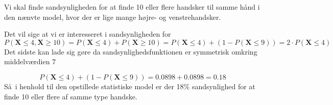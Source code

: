 {
Vi skal finde sandsynligheden for at finde 10 eller flere handsker til samme h\aa nd i den n\ae nvte model, hvor der er lige mange h\o jre- og venstrehandsker.

Det vil sige at vi er interesseret i sandsynligheden for
\[
P(\mathbf{X} \leq 4,\mathbf{X}\geq 10) = P(\mathbf{X} \leq 4) + P(\mathbf{X}\geq 10) = P(\mathbf{X} \leq 4) + (1 - P(\mathbf{X} \leq 9)) = 2 \cdot P(\mathbf{X} \leq 4)
\]
Det sidste kan lade sig g\o re da sandsynlighedsfunktionen er symmetrisk omkring middelv\ae rdien $7$

\[
P(\mathbf{X} \leq 4) + (1 - P(\mathbf{X} \leq 9)) = 0.0898 + 0.0898 = 0.18
\]
S\aa\ i henhold til den opstillede statistiske model er der 18\% sandsynlighed for at finde 10 eller flere af samme type handske.
}
